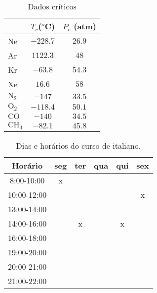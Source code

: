 \documentclass[10pt]{article}
\begin{document}
\renewcommand{\tablename}{Tabela}

\begin{table}[h]
\caption{Dados críticos}
\centering
\vspace{0.2cm}
\begin{tabular}{l c c}
\hline
 & $T_{c}$($^{o}$C) & $P_{c}$ (atm)\\
\hline
Ne & $-228.7$ & $26.9$\\
Ar & $1122.3$ & $48$\\
Kr & $-63.8$ & $54.3$\\
Xe & $16.6$ & $58$\\
$\text{N}_{2}$ & $-147$ & $33.5$\\
$\text{O}_{2}$ & $-118.4$ & $50.1$\\
$\text{CO}$ & $-140$ & $34.5$\\
$\text{CH}_{4}$ & $-82.1$ & $45.8$\\
\hline
\end{tabular}
\label{dadoscriticos}
\end{table}

\begin{table}[h]
\centering
\begin{tabular}{| c | c | c | c | c | c |}
\hline
{\bf Horário} & \bf seg  & \bf ter & \bf qua & \bf  qui & \bf sex \\
\hline
8:00-10:00   & x &   &  &   &   \\ \hline
10:00-12:00  &   &   &  &   & x \\ \hline
13:00-14:00  &   &   &  &   &   \\ \hline
14:00-16:00  &   & x &  & x &   \\ \hline
16:00-18:00  &   &   &  &   &   \\ \hline
19:00-20:00  &   &   &  &   &   \\ \hline
20:00-21:00  &   &   &  &   &   \\ \hline
21:00-22:00  &   &   &  &   &   \\ \hline
\end{tabular}
\caption{Dias e horários do curso de italiano.}
\label{diasehorarios}
\end{table}
\end{document}
